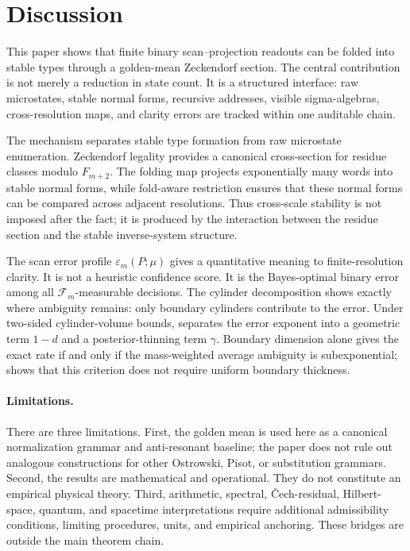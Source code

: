 \section{Discussion}
\label{sec:discussion}

This paper shows that finite binary scan--projection readouts can be folded into stable types through a golden-mean Zeckendorf section.  The central contribution is not merely a reduction in state count.  It is a structured interface: raw microstates, stable normal forms, recursive addresses, visible sigma-algebras, cross-resolution maps, and clarity errors are tracked within one auditable chain.

The mechanism separates stable type formation from raw microstate enumeration.  Zeckendorf legality provides a canonical cross-section for residue classes modulo \(F_{m+2}\).  The folding map projects exponentially many words into stable normal forms, while fold-aware restriction ensures that these normal forms can be compared across adjacent resolutions.  Thus cross-scale stability is not imposed after the fact; it is produced by the interaction between the residue section and the stable inverse-system structure.

The scan error profile \(\varepsilon_m(P;\mu)\) gives a quantitative meaning to finite-resolution clarity.  It is not a heuristic confidence score.  It is the Bayes-optimal binary error among all \(\mathcal F_m\)-measurable decisions.  The cylinder decomposition shows exactly where ambiguity remains: only boundary cylinders contribute to the error.  Under two-sided cylinder-volume bounds,  separates the error exponent into a geometric term \(1-d\) and a posterior-thinning term \(\gamma\).  Boundary dimension alone gives the exact rate if and only if the mass-weighted average ambiguity is subexponential;  shows that this criterion does not require uniform boundary thickness.

\paragraph{Limitations.}
There are three limitations.  First, the golden mean is used here as a canonical normalization grammar and anti-resonant baseline; the paper does not rule out analogous constructions for other Ostrowski, Pisot, or substitution grammars.  Second, the results are mathematical and operational.  They do not constitute an empirical physical theory.  Third, arithmetic, spectral, \v{C}ech-residual, Hilbert-space, quantum, and spacetime interpretations require additional admissibility conditions, limiting procedures, units, and empirical anchoring.  These bridges are outside the main theorem chain.

